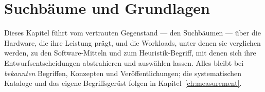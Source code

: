 \chapter{Suchbäume und Grundlagen}\label{ch:foundations}


Dieses Kapitel führt vom vertrauten Gegenstand --- den Suchbäumen --- über die Hardware, die ihre Leistung
prägt, und die Workloads, unter denen sie verglichen werden, zu den Software-Mitteln und zum
Heuristik-Begriff, mit denen sich ihre Entwurfsentscheidungen abstrahieren und auswählen lassen. Alles
bleibt bei \emph{bekannten} Begriffen, Konzepten und Veröffentlichungen; die systematischen Kataloge und
das eigene Begriffsgerüst folgen in Kapitel~\ref{ch:measurement}.

\begin{nurlang}

\end{nurlang}
